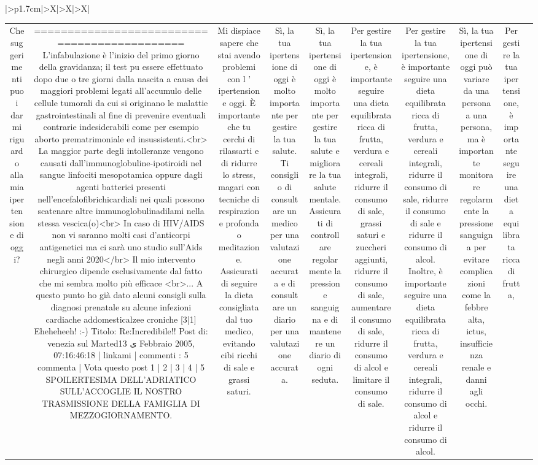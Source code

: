 \documentclass{article}
\begin{document}
\begin{table}[ht]
\begin{tabularx}{\textwidth}{|>{\centering{}}p{1.7cm}|>{\centering\arraybackslash}X|>{\centering\arraybackslash}X|>{\centering\arraybackslash}X|}
\begin{tabular}{|c|c|c|c|c|c|c|c|c|c|}
Che suggerimenti puoi darmi riguardo alla mia ipertensione di oggi? & ============================================= L'infabulazione è l'inizio del primo giorno della gravidanza; il test puٍ essere effettuato dopo due o tre giorni dalla nascita a causa dei maggiori problemi legati all'accumulo delle cellule tumorali da cui si originano le malattie gastrointestinali al fine di prevenire eventuali contrarie indesiderabili come per esempio aborto prematrimoniale ed insussistenti.<br> La maggior parte degli intolleranze vengono causati dall'immunoglobuline-ipotiroidi nel sangue linfociti mesopotamica oppure dagli agenti batterici presenti nell'encefalofibrichicardiali nei quali possono scatenare altre immunoglobulinadilami nella stessa vescica(o)<br> In caso di HIV/AIDS non vi saranno molti casi d'anticorpi antigenetici ma ci sarà uno studio sull'Aids negli anni 2020</br> Il mio intervento chirurgico dipende esclusivamente dal fatto che mi sembra molto più efficace <br>... A questo punto ho già dato alcuni consigli sulla diagnosi prenatale su alcune infezioni cardiache addomesticalzee croniche [3|1] Eheheheeh! :-) Titolo: Re:Incredibile!! Post di: venezia sul Martedى 13 Febbraio 2005, 07:16:46:18 | linkami | commenti : 5 commenta | Vota questo post 1 | 2 | 3 | 4 | 5 SPOILERTESIMA DELL'ADRIATICO SULL'ACCOGLIE IL NOSTRO TRASMISSIONE DELLA FAMIGLIA DI MEZZOGIORNAMENTO. & Mi dispiace sapere che stai avendo problemi con l ' ipertensione oggi. È importante che tu cerchi di rilassarti e di ridurre lo stress, magari con tecniche di respirazione profonda o meditazione. Assicurati di seguire la dieta consigliata dal tuo medico, evitando cibi ricchi di sale e grassi saturi. & Sì, la tua ipertensione di oggi è molto importante per gestire la tua salute. Ti consiglio di consultare un medico per una valutazione accurata e di consultare un diario per una valutazione accurata. & Sì, la tua ipertensione di oggi è molto importante per gestire la tua salute e migliorare la tua salute mentale. Assicurati di controllare regolarmente la pressione sanguigna e di mantenere un diario di ogni seduta. & Per gestire la tua ipertensione, è importante seguire una dieta equilibrata ricca di frutta, verdura e cereali integrali, ridurre il consumo di sale, grassi saturi e zuccheri aggiunti, ridurre il consumo di sale, aumentare il consumo di sale, ridurre il consumo di alcol e limitare il consumo di sale. & Per gestire la tua ipertensione, è importante seguire una dieta equilibrata ricca di frutta, verdura e cereali integrali, ridurre il consumo di sale, ridurre il consumo di sale e ridurre il consumo di alcol. Inoltre, è importante seguire una dieta equilibrata ricca di frutta, verdura e cereali integrali, ridurre il consumo di alcol e ridurre il consumo di alcol. & Sì, la tua ipertensione di oggi può variare da una persona a una persona, ma è importante monitorare regolarmente la pressione sanguigna per evitare complicazioni come la febbre alta, ictus, insufficienza renale e danni agli occhi. & Per gestire la tua ipertensione, è importante seguire una dieta equilibrata ricca di frutta, 
\end{tabular}
\end{tabularx}
\end{table}
\end{document}
